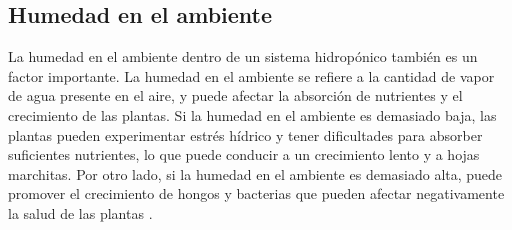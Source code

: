 \subsection{Humedad en el ambiente}
La humedad en el ambiente dentro de un sistema hidropónico también es un factor importante. La humedad en el ambiente se refiere a la cantidad de vapor de agua presente en el aire, y puede afectar la absorción de nutrientes y el crecimiento de las plantas. Si la humedad en el ambiente es demasiado baja, las plantas pueden experimentar estrés hídrico y tener dificultades para absorber suficientes nutrientes, lo que puede conducir a un crecimiento lento y a hojas marchitas. Por otro lado, si la humedad en el ambiente es demasiado alta, puede promover el crecimiento de hongos y bacterias que pueden afectar negativamente la salud de las plantas \cite{siddiq2019achpa}.

